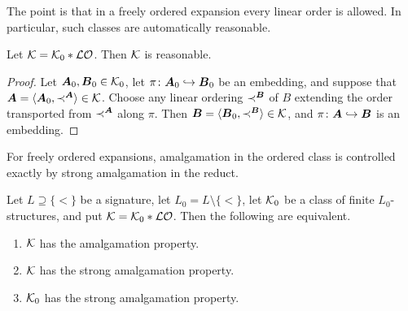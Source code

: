 The point is that in a freely ordered expansion every linear order is allowed. In particular, such classes are automatically reasonable.

\begin{lemma}
    Let \(\mathcal{K}=\mathcal{K}_0 * \mathcal{LO}\). Then \(\mathcal{K}\) is reasonable.
\end{lemma}

\begin{proof}
    Let \(\boldsymbol{A}_0,\boldsymbol{B}_0\in\mathcal{K}_0\), let \(\pi\colon \boldsymbol{A}_0\hookrightarrow \boldsymbol{B}_0\) be an embedding, and suppose that \(\boldsymbol{A}=\langle \boldsymbol{A}_0,\prec^{\boldsymbol{A}}\rangle\in\mathcal{K}\).
    Choose any linear ordering \(\prec^{\boldsymbol{B}}\) of \(B\) extending the order transported from \(\prec^{\boldsymbol{A}}\) along \(\pi\). Then \(\boldsymbol{B}=\langle \boldsymbol{B}_0,\prec^{\boldsymbol{B}}\rangle\in\mathcal{K}\),
    and \(\pi\colon \boldsymbol{A}\hookrightarrow \boldsymbol{B}\) is an embedding.
\end{proof}

For freely ordered expansions, amalgamation in the ordered class is controlled exactly by strong amalgamation in the reduct.
\begin{proposition}
    \label{prop:free-orders-sap}
    Let \(L\supseteq\{<\}\) be a signature, let \(L_0=L\setminus\{<\}\), let \(\mathcal{K}_0\) be a class of finite \(L_0\)-structures, and put \(\mathcal{K}=\mathcal{K}_0 * \mathcal{LO}\).
    Then the following are equivalent.
    \begin{enumerate}
        \item[(i)] \(\mathcal{K}\) has the amalgamation property.
        \item[(ii)] \(\mathcal{K}\) has the strong amalgamation property.
        \item[(iii)] \(\mathcal{K}_0\) has the strong amalgamation property.
    \end{enumerate}
\end{proposition}

